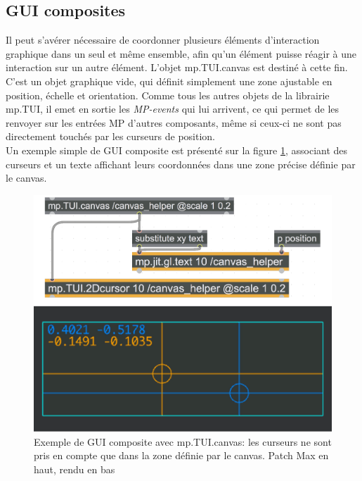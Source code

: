 \subsection{GUI composites}

\noindent Il peut s'avérer nécessaire de coordonner plusieurs éléments d'interaction graphique dans un seul et même ensemble, afin qu'un élément puisse réagir à une interaction sur un autre élément. L'objet mp.TUI.canvas est destiné à cette fin. C'est un objet graphique vide, qui définit simplement une zone ajustable en position, échelle et orientation. Comme tous les autres objets de la librairie mp.TUI, il emet en sortie les \textit{MP-events} qui lui arrivent, ce qui permet de les renvoyer sur les entrées MP d'autres composants, même si ceux-ci ne sont pas directement touchés par les curseurs de position.\\
\indent Un exemple simple de \gls{GUI} composite est présenté sur la figure \ref{fig:visual_representation:canvas}, associant des curseurs et un texte affichant leurs coordonnées dans une zone précise définie par le canvas.


\begin{figure}[!htbp]
	\captionsetup{format=plain}%
	\includegraphics[width=\textwidth]{gfx/06_visual_representation/mpTUI_canvas.pdf}
	\caption[Exemple de GUI composite avec mp.TUI.canvas]{Exemple de GUI composite avec mp.TUI.canvas: les curseurs ne sont pris en compte que dans la zone définie par le canvas. Patch Max en haut, rendu en bas}
	\label{fig:visual_representation:canvas}
\end{figure}

